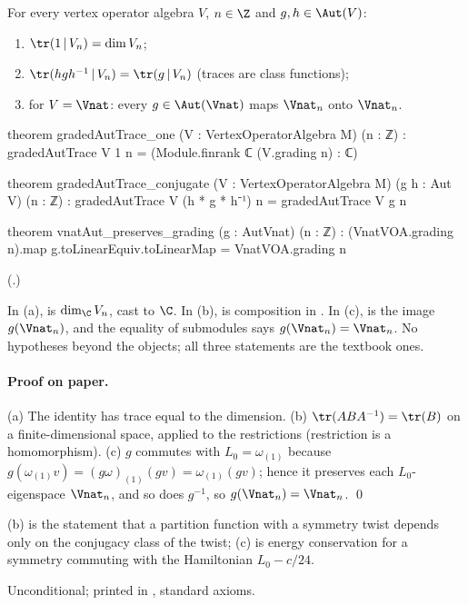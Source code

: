\begin{proposition}\label{ch16:prop:traces}
For every vertex operator algebra $V$, $n\in\Z$ and $g,h\in\Aut(V)$:
\begin{enumerate}[label=(\alph*)]
\item $\tr(1\,|\,V_n)=\dim V_n$;
\item $\tr(hgh^{-1}\,|\,V_n)=\tr(g\,|\,V_n)$ (traces are class functions);
\item for $V=\Vnat$: every $g\in\Aut(\Vnat)$ maps $\Vnat_n$ onto $\Vnat_n$.
\end{enumerate}
\end{proposition}
\begin{leancode}
theorem gradedAutTrace_one (V : VertexOperatorAlgebra M) (n : ℤ) :
    gradedAutTrace V 1 n = (Module.finrank ℂ (V.grading n) : ℂ)

theorem gradedAutTrace_conjugate (V : VertexOperatorAlgebra M) (g h : Aut V) (n : ℤ) :
    gradedAutTrace V (h * g * h⁻¹) n = gradedAutTrace V g n

theorem vnatAut_preserves_grading (g : AutVnat) (n : ℤ) :
    (VnatVOA.grading n).map g.toLinearEquiv.toLinearMap = VnatVOA.grading n
\end{leancode}
(.)
\begin{dictionary}
In (a),  is $\dim_\C V_n$, cast to $\C$.  In (b),  is
composition in .  In (c),  is the image
$g(\Vnat_n)$, and the equality of submodules says $g(\Vnat_n)=\Vnat_n$.  No hypotheses beyond the objects; all three
statements are the textbook ones.
\end{dictionary}
\paragraph{Proof on paper.}  (a) The identity has trace equal to the dimension.  (b) $\tr(ABA^{-1})=\tr(B)$ on a
finite-dimensional space, applied to the restrictions (restriction is a homomorphism).  (c) $g$ commutes with
$L_0=\omega_{(1)}$ because $g(\omega_{(1)}v)=(g\omega)_{(1)}(gv)=\omega_{(1)}(gv)$; hence it preserves each
$L_0$-eigenspace $\Vnat_n$, and so does $g^{-1}$, so $g(\Vnat_n)=\Vnat_n$. \qed
\begin{physics}
(b) is the statement that a partition function with a symmetry twist depends only on the conjugacy class of the
twist; (c) is energy conservation for a symmetry commuting with the Hamiltonian $L_0-c/24$.
\end{physics}
\begin{status}
Unconditional; printed in , standard axioms.
\end{status}

